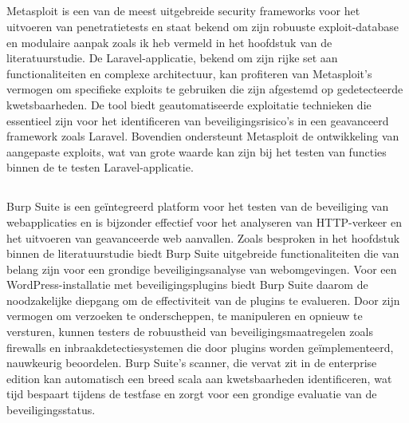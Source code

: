 \subsection{}
Metasploit is een van de meest uitgebreide security frameworks voor het uitvoeren van penetratietests en 
staat bekend om zijn robuuste exploit-database en modulaire aanpak zoals ik heb vermeld in het hoofdstuk 
 van de literatuurstudie. De Laravel-applicatie, bekend 
om zijn rijke set aan functionaliteiten en complexe architectuur, kan profiteren van Metasploit's 
vermogen om specifieke exploits te gebruiken die zijn afgestemd op gedetecteerde kwetsbaarheden. 
De tool biedt geautomatiseerde exploitatie technieken die essentieel zijn voor het identificeren 
van beveiligingsrisico's in een geavanceerd framework zoals Laravel. Bovendien ondersteunt 
Metasploit de ontwikkeling van aangepaste exploits, wat van grote waarde kan zijn bij 
het testen van functies binnen de te testen Laravel-applicatie.

\subsection{}
Burp Suite is een geïntegreerd platform voor het testen van de beveiliging van webapplicaties en is 
bijzonder effectief voor het analyseren van HTTP-verkeer en het uitvoeren van geavanceerde web 
aanvallen. Zoals besproken in het hoofdstuk  binnen de literatuurstudie 
biedt Burp Suite uitgebreide functionaliteiten die van belang zijn voor een grondige beveiligingsanalyse 
van webomgevingen. Voor een WordPress-installatie met beveiligingsplugins biedt Burp Suite daarom de noodzakelijke 
diepgang om de effectiviteit van de plugins te evalueren. Door zijn vermogen om verzoeken te 
onderscheppen, te manipuleren en opnieuw te versturen, kunnen testers de robuustheid van 
beveiligingsmaatregelen zoals firewalls en inbraakdetectiesystemen die door plugins worden 
geïmplementeerd, nauwkeurig beoordelen. Burp Suite's scanner, die vervat zit in de enterprise edition kan automatisch een breed scala 
aan kwetsbaarheden identificeren, wat tijd bespaart tijdens de testfase en zorgt voor een 
grondige evaluatie van de beveiligingsstatus.

